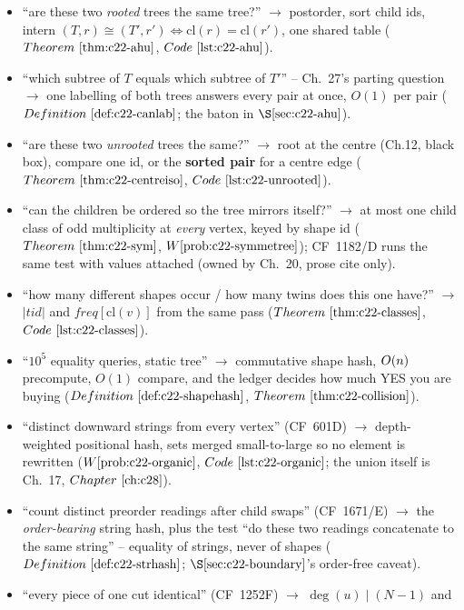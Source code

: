 \begin{itemize}[nosep, leftmargin=1.4em]
  \item ``are these two \emph{rooted} trees the same tree?'' \(\to\) postorder, sort child
        ids, intern \((T,r)\cong(T',r')\iff\mathrm{cl}(r)=\mathrm{cl}(r')\), one shared
        table (\(\thmref{c22-ahu}\), \(\coderef{c22-ahu}\)).
  \item ``which subtree of \(T\) equals which subtree of \(T'\)'' -- Ch.~27's parting
        question \(\to\) one labelling of both trees answers every pair at once, \(O(1)\)
        per pair (\(\defref{c22-canlab}\); the baton in \(\secref{c22-ahu}\)).
  \item ``are these two \emph{unrooted} trees the same?'' \(\to\) root at the centre
        (Ch.12, black box), compare one id, or the \textbf{sorted pair} for a centre edge
        (\(\thmref{c22-centreiso}\), \(\coderef{c22-unrooted}\)).
  \item ``can the children be ordered so the tree mirrors itself?'' \(\to\) at most one
        child class of odd multiplicity at \emph{every} vertex, keyed by shape id
        (\(\thmref{c22-sym}\), \(\probref{c22-symmetree}\)); CF~1182/D runs the same test
        with values attached (owned by Ch.~20, prose cite only).
  \item ``how many different shapes occur / how many twins does this one have?'' \(\to\)
        \(|\mathit{tid}|\) and \(\mathit{freq}[\mathrm{cl}(v)]\) from the same pass
        (\(\thmref{c22-classes}\), \(\coderef{c22-classes}\)).
  \item ``\(10^5\) equality queries, static tree'' \(\to\) commutative shape hash,
        \(O(n)\) precompute, \(O(1)\) compare, and the ledger decides how much YES you
        are buying (\(\defref{c22-shapehash}\), \(\thmref{c22-collision}\)).
  \item ``distinct downward strings from every vertex'' (CF~601D) \(\to\) depth-weighted
        positional hash, sets merged small-to-large so no element is rewritten
        (\(\probref{c22-organic}\), \(\coderef{c22-organic}\); the union itself is Ch.~17,
        \(\chref{c28}\)).
  \item ``count distinct preorder readings after child swaps'' (CF~1671/E) \(\to\) the
        \emph{order-bearing} string hash, plus the test ``do these two readings concatenate
        to the same string'' -- equality of strings, never of shapes
        (\(\defref{c22-strhash}\); \(\secref{c22-boundary}\)'s order-free caveat).
  \item ``every piece of one cut identical'' (CF~1252F) \(\to\) \(\deg(u)\mid(N{-}1)\) and

\end{itemize}
